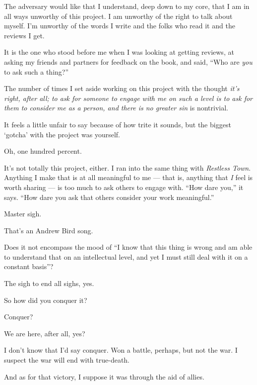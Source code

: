 \begin{paracol}{2}
\begin{rightcolumn}
  The adversary would like that I understand, deep down to my core, that I am in all ways unworthy of this project. I am unworthy of the right to talk about myself. I'm unworthy of the words I write and the folks who read it and the reviews I get.

  It is the one who stood before me when I was looking at getting reviews, at asking my friends and partners for feedback on the book, and said, ``Who are \emph{you} to ask such a thing?''

  The number of times I set aside working on this project with the thought \emph{it's right, after all; to ask for someone to engage with me on such a level is to ask for them to consider me as a person, and there is no greater sin} is nontrivial.

  \begin{ally}
    It feels a little unfair to say because of how trite it sounds, but the biggest `gotcha' with the project was yourself.
  \end{ally}
  Oh, one hundred percent.

  It's not totally this project, either. I ran into the same thing with \emph{Restless Town}. Anything I make that is at all meaningful to me --- that is, anything that \emph{I} feel is worth sharing --- is too much to ask others to engage with. ``How dare you,'' it says. ``How dare you ask that others consider your work meaningful.''

  \begin{ally}
    Master sigh.
  \end{ally}
  That's an Andrew Bird song.

  \begin{ally}
    Does it not encompass the mood of ``I know that this thing is wrong and am able to understand that on an intellectual level, and yet I must still deal with it on a constant basis''?
  \end{ally}
  The sigh to end all sighs, yes.

  \begin{ally}
    So how did you conquer it?
  \end{ally}
  Conquer?

  \begin{ally}
    We are here, after all, yes?
  \end{ally}
  I don't know that I'd say conquer. Won a battle, perhaps, but not the war. I suspect the war will end with true-death.

  And as for that victory, I suppose it was through the aid of allies.


\end{rightcolumn}
\end{paracol}
